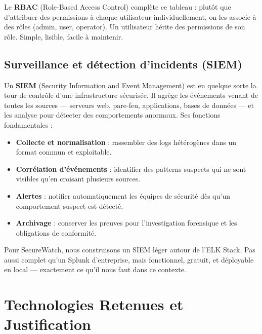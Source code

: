 \documentclass[12pt, a4paper]{report}
\begin{document}
Le \textbf{RBAC} (Role-Based Access Control) complète ce tableau : plutôt que d'attribuer des permissions à chaque utilisateur individuellement, on les associe à des rôles (admin, user, operator). Un utilisateur hérite des permissions de son rôle. Simple, lisible, facile à maintenir.

\subsection{Surveillance et détection d'incidents (SIEM)}

Un \textbf{SIEM} (Security Information and Event Management) est en quelque sorte la tour de contrôle d'une infrastructure sécurisée. Il agrège les événements venant de toutes les sources — serveurs web, pare-feu, applications, bases de données — et les analyse pour détecter des comportements anormaux. Ses fonctions fondamentales :

\begin{itemize}[leftmargin=*]
  \item \textbf{Collecte et normalisation} : rassembler des logs hétérogènes dans un format commun et exploitable.
  \item \textbf{Corrélation d'événements} : identifier des patterns suspects qui ne sont visibles qu'en croisant plusieurs sources.
  \item \textbf{Alertes} : notifier automatiquement les équipes de sécurité dès qu'un comportement suspect est détecté.
  \item \textbf{Archivage} : conserver les preuves pour l'investigation forensique et les obligations de conformité.
\end{itemize}

Pour SecureWatch, nous construisons un SIEM léger autour de l'ELK Stack. Pas aussi complet qu'un Splunk d'entreprise, mais fonctionnel, gratuit, et déployable en local — exactement ce qu'il nous faut dans ce contexte.

\section{Technologies Retenues et Justification}
\end{document}

